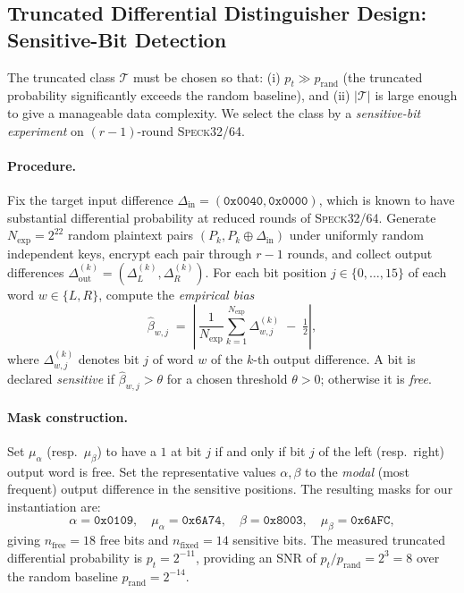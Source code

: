 \documentclass[runningheads]{llncs}
\newcommand{\speck}{\textsc{Speck}32/64}
\newcommand{\xor}{\oplus}
\begin{document}
\subsection{Truncated Differential Distinguisher Design: Sensitive-Bit Detection}
\label{subsec:sensitive}

The truncated class $\mathcal{T}$ must be chosen so that:
(i) $p_t \gg p_{\mathrm{rand}}$ (the truncated probability significantly
exceeds the random baseline), and (ii) $|\mathcal{T}|$ is large enough
to give a manageable data complexity.
We select the class by a \emph{sensitive-bit experiment} on $(r-1)$-round
\speck{}.

\paragraph{Procedure.}
Fix the target input difference
$\Delta_{\mathrm{in}} = (\mathtt{0x0040}, \mathtt{0x0000})$, which is
known to have substantial differential probability at reduced rounds of
\speck{}.
Generate $N_{\exp} = 2^{22}$ random plaintext pairs $(P_k, P_k \xor
\Delta_{\mathrm{in}})$ under uniformly random independent keys, encrypt
each pair through $r - 1$ rounds, and collect output differences
$\Delta^{(k)}_{\mathrm{out}} = (\Delta^{(k)}_L, \Delta^{(k)}_R)$.
For each bit position $j \in \{0, \ldots, 15\}$ of each word $w \in
\{L, R\}$, compute the \emph{empirical bias}
\begin{equation}
  \label{eq:bias}
  \hat{\beta}_{w,j}
  \;=\;
  \left\lvert\,
    \frac{1}{N_{\exp}} \sum_{k=1}^{N_{\exp}} \Delta^{(k)}_{w,j}
    \;-\; \tfrac{1}{2}
  \right\rvert,
\end{equation}
where $\Delta^{(k)}_{w,j}$ denotes bit $j$ of word $w$ of the $k$-th
output difference.  A bit is declared \emph{sensitive} if
$\hat{\beta}_{w,j} > \theta$ for a chosen threshold $\theta > 0$;
otherwise it is \emph{free}.

\paragraph{Mask construction.}
Set $\mu_\alpha$ (resp.\ $\mu_\beta$) to have a $1$ at bit $j$ if and
only if bit $j$ of the left (resp.\ right) output word is free.  Set
the representative values $\alpha, \beta$ to the \emph{modal} (most
frequent) output difference in the sensitive positions.  The resulting
masks for our instantiation are:
\begin{equation}
  \label{eq:masks}
  \alpha = \mathtt{0x0109},\quad
  \mu_\alpha = \mathtt{0x6A74},\quad
  \beta = \mathtt{0x8003},\quad
  \mu_\beta = \mathtt{0x6AFC},
\end{equation}
giving $n_{\mathrm{free}} = 18$ free bits and $n_{\mathrm{fixed}} = 14$
sensitive bits.  The measured truncated differential probability is
$p_t = 2^{-11}$, providing an SNR of $p_t / p_{\mathrm{rand}} = 2^3 = 8$
over the random baseline $p_{\mathrm{rand}} = 2^{-14}$.
\end{document}
